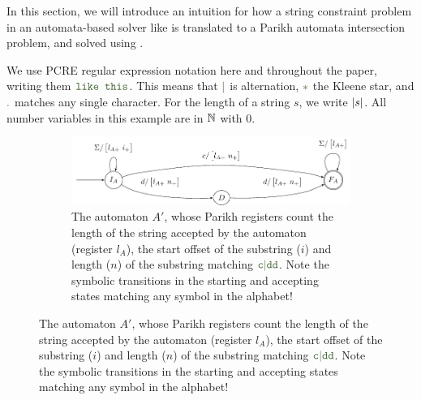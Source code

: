 In this section, we will introduce an intuition for how a string constraint
problem in an automata-based solver like \OstrichPlus{} is translated to a
Parikh automata intersection problem, and solved using \Calculus{}.

We use PCRE regular expression notation here and throughout the paper, writing
them $\Regex{\texttt{like this}}$. This means that $\Regex{\RegexOr{}}$ is alternation,
$\Regex{\mathtt{*}}$ the Kleene star, and $\Regex{\mathtt{.}}$ matches any single character.
For the length of a string $s$, we write $|s|$. All number variables in
this example are in $\mathbb{N}$ with $0$.

\newcommand{\autscale}[0]{0.60}

\begin{figure}[ht]
    \centering 
  \begin{subfigure}[b]{0.8\textwidth}
    \centering
    \includegraphics[width=\textwidth]{a}
    \caption{The automaton $A'$, whose Parikh registers count the length of the
    string accepted by the automaton (register $l_A$), the start offset of the
    substring ($i$) and length ($n$) of the substring matching
    $\Regex{c\RegexOr{}dd}$. Note the symbolic transitions in the starting and
    accepting states matching any symbol in the alphabet!}\label{fig:aut_a}
  \end{subfigure}%


\end{figure}
